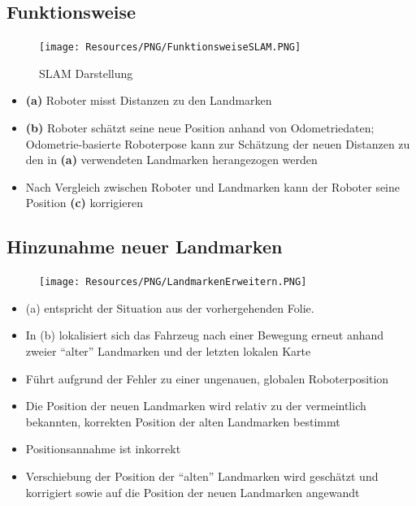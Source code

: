 \subsection{Funktionsweise}
\begin{figure}[H]
	\begin{center}
		\texttt{[image: Resources/PNG/FunktionsweiseSLAM.PNG]}
		\caption{SLAM Darstellung}
		\label{fig:PNG/FunktionsweiseSLAM.PNG}
	\end{center}
\end{figure}
\begin{itemize}
	\item \textbf{(a)} Roboter misst Distanzen zu den Landmarken
	\item \textbf{(b)} Roboter schätzt seine neue Position anhand von Odometriedaten; Odometrie-basierte Roboterpose kann zur Schätzung der neuen Distanzen zu den in \textbf{(a)} verwendeten Landmarken herangezogen werden
	\item Nach Vergleich zwischen Roboter und Landmarken kann der Roboter seine Position \textbf{(c)} korrigieren
\end{itemize}

\subsection{Hinzunahme neuer Landmarken}
\begin{figure}[H]
	\begin{center}
		\texttt{[image: Resources/PNG/LandmarkenErweitern.PNG]}
		\caption{}
		\label{fig:PNG/LandmarkenErweitern.PNG}
	\end{center}
\end{figure}
\begin{itemize}
	\item (a) entspricht der Situation aus der vorhergehenden Folie.
	\item In (b) lokalisiert sich das Fahrzeug nach einer Bewegung erneut anhand
		zweier \enquote{alter} Landmarken und der letzten lokalen Karte
	\item Führt aufgrund der Fehler zu einer ungenauen, globalen Roboterposition
	\item Die Position der neuen Landmarken wird relativ zu der vermeintlich
		bekannten, korrekten Position der alten Landmarken bestimmt
	\item Positionsannahme ist inkorrekt
	\item Verschiebung der Position der \enquote{alten} Landmarken wird geschätzt
		und korrigiert sowie auf die Position der neuen Landmarken angewandt
\end{itemize}

